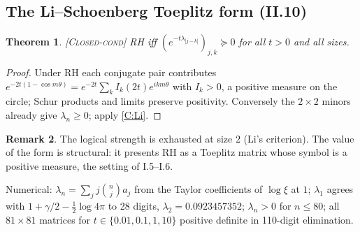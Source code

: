 \documentclass[11pt]{amsart}
\theoremstyle{plain}
\newtheorem{theorem}{Theorem}[section]
\theoremstyle{definition}
\newtheorem{remark}[theorem]{Remark}
\newcommand{\status}[1]{\textsc{[#1]}}
\begin{document}
\subsection{The Li--Schoenberg Toeplitz form (II.10)}
\begin{theorem}\status{Closed-cond}
RH iff $(e^{-t\lambda_{|j-k|}})_{j,k}\succeq0$ for all $t>0$ and all sizes.
\end{theorem}
\begin{proof}
Under RH each conjugate pair contributes
$e^{-2t(1-\cos m\theta)}=e^{-2t}\sum_kI_k(2t)e^{ikm\theta}$ with $I_k>0$, a positive
measure on the circle; Schur products and limits preserve positivity.
Conversely the $2\times2$ minors already give $\lambda_n\ge0$; apply \ref{C:Li}.
\end{proof}
\begin{remark}
The logical strength is exhausted at size $2$ (Li's criterion). The value of the
form is structural: it presents RH as a Toeplitz matrix whose symbol is a positive
measure, the setting of I.5--I.6.
\end{remark}
\noindent Numerical: $\lambda_n=\sum_jj\binom nja_j$ from the Taylor coefficients of
$\log\xi$ at $1$; $\lambda_1$ agrees with $1+\gamma/2-\frac12\log4\pi$ to 28 digits,
$\lambda_2=0.0923457352$; $\lambda_n>0$ for $n\le80$; all $81\times81$ matrices for
$t\in\{0.01,0.1,1,10\}$ positive definite in 110-digit elimination.
\end{document}
